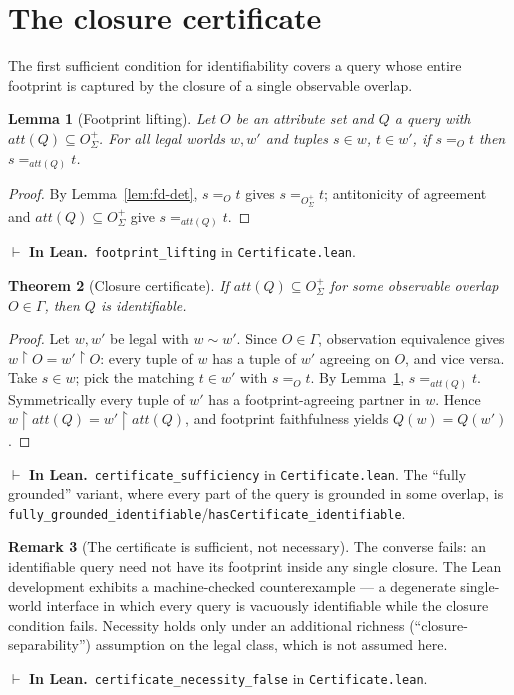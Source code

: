 \documentclass[11pt]{article}
\newcommand{\att}[1]{\mathit{att}(#1)}
\newcommand{\clo}[1]{{#1}^{+}_{\Sigma}}      %
\newcommand{\ObsFam}{\Gamma}                 %
\newcommand{\proj}[2]{#1{\restriction}#2}    %
\newcommand{\lean}[1]{\texttt{#1}}           %
\theoremstyle{plain}
\newtheorem{theorem}{Theorem}
\newtheorem{lemma}[theorem]{Lemma}
\theoremstyle{definition}
\newtheorem{remark}[theorem]{Remark}
\newcommand{\inlean}[1]{\par\smallskip\noindent%
  {\small\textcolor{blue!50!black}{$\vdash$ \textbf{In Lean.}}~#1}\par\smallskip}
\begin{document}
\section{The closure certificate}\label{sec:cert}

The first sufficient condition for identifiability covers a query whose entire footprint is
captured by the closure of a single observable overlap.

\begin{lemma}[Footprint lifting]\label{lem:footprint-lift}
Let $O$ be an attribute set and $Q$ a query with $\att Q\subseteq\clo O$. For all legal
worlds $w,w'$ and tuples $s\in w$, $t\in w'$, if $s =_O t$ then $s =_{\att Q} t$.
\end{lemma}
\begin{proof}
By Lemma~\ref{lem:fd-det}, $s =_O t$ gives $s =_{\clo O} t$; antitonicity of agreement and
$\att Q\subseteq\clo O$ give $s =_{\att Q} t$.
\end{proof}
\inlean{\lean{footprint\_lifting} in \lean{Certificate.lean}.}

\begin{theorem}[Closure certificate]\label{thm:cert}
If $\att Q\subseteq\clo O$ for some observable overlap $O\in\ObsFam$, then $Q$ is identifiable.
\end{theorem}
\begin{proof}
Let $w,w'$ be legal with $w\sim w'$. Since $O\in\ObsFam$, observation equivalence gives
$\proj w O=\proj{w'} O$: every tuple of $w$ has a tuple of $w'$ agreeing on $O$, and
vice versa. Take $s\in w$; pick the matching $t\in w'$ with $s =_O t$. By
Lemma~\ref{lem:footprint-lift}, $s =_{\att Q} t$. Symmetrically every tuple of $w'$ has a
footprint-agreeing partner in $w$. Hence $\proj w{\att Q}=\proj{w'}{\att Q}$, and footprint
faithfulness yields $Q(w)=Q(w')$.
\end{proof}
\inlean{\lean{certificate\_sufficiency} in \lean{Certificate.lean}. The ``fully grounded''
variant, where every part of the query is grounded in some overlap, is
\lean{fully\_grounded\_identifiable}/\lean{hasCertificate\_identifiable}.}

\begin{remark}[The certificate is sufficient, not necessary]\label{rem:necessity-false}
The converse fails: an identifiable query need not have its footprint inside any single
closure. The Lean development exhibits a machine-checked counterexample --- a degenerate
single-world interface in which every query is vacuously identifiable while the closure
condition fails. Necessity holds only under an additional richness (``closure-separability'')
assumption on the legal class, which is not assumed here.
\inlean{\lean{certificate\_necessity\_false} in \lean{Certificate.lean}.}
\end{remark}
\end{document}
